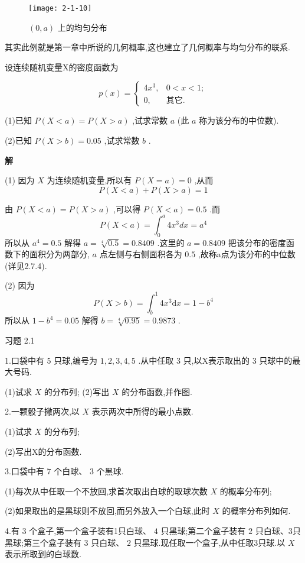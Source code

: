 \begin{figure}
	\centering
	\texttt{[image: 2-1-10]}
	\caption{ $ (0,a) $ 上的均匀分布}
	\label{fig:2-1-10}
\end{figure}

其实此例就是第一章中所说的几何概率,这也建立了几何概率与均匀分布的联系.

\begin{example}
	设连续随机变量X的密度函数为
	
	\[ 
	p(x)=\left\{\begin{array}{ll}
	{4 x^{3},} & {0<x<1}; \\ 
	{0},&{\text{其它}}.
	\end{array}\right.
	\]
	
	(1)已知 $ P(X<a)=P(X>a) $ ,试求常数 $ a $ (此 $ a $ 称为该分布的中位数).
	
	(2)已知 $ P(X>b)=0.05 $ ,试求常数 $ b $ .
	
	\textbf{解}
	
	(1) 因为 $ X $ 为连续随机变量,所以有 $ P(X=a)=0 $ ,从而
	\[ 
	P(X<a)+P(X>a)=1
	\]
	
	由 $ P(X<a)=P(X>a) $ ,可以得 $ P(X<a)=0.5 $ .而
	\[ 
	P(X<a)=\int_{0}^{a} 4 x^{3} d x=a^{4}
	\]
	所以从 $ a^4=0.5 $ 解得 $ a=\sqrt[4]{0.5}=0.8409 $ .这里的 $ a=0.8409 $ 把该分布的密度函数下的面积分为两部分, $ a $ 点左侧与右侧面积各为 $ 0.5 $ ,故称a点为该分布的中位数(详见2.7.4).
	
	(2) 因为
	\[ 
	P(X>b)=\int_{b}^{1} 4 x^{3} \mathrm{d} x=1-b^{4}
	\]
	所以从 $ 1-b^{4}=0.05 $ 解得 $ b=\sqrt[4]{0.95}=0.9873 $ .
\end{example}

习题 2.1

1.口袋中有 $ 5 $ 只球,编号为 $ 1,2,3,4,5 $ .从中任取 $ 3 $ 只,以X表示取出的 $ 3 $ 只球中的最大号码.

(1)试求 $ X $ 的分布列;
(2)写出 $ X $ 的分布函数,并作图.

2.一颗骰子撇两次,以 $ X $ 表示两次中所得的最小点数.

(1)试求 $ X $ 的分布列;

(2)写出X的分布函数.

3.口袋中有 $ 7 $ 个白球、 $ 3 $ 个黑球.

(1)每次从中任取一个不放回,求首次取出白球的取球次数 $ X $ 的概率分布列;

(2)如果取出的是黑球则不放回,而另外放入一个白球,此时 $ X $ 的概率分布列如何.

4.有 $ 3 $ 个盒子,第一个盒子装有1只白球、 $ 4 $ 只黑球;第二个盒子装有 $ 2 $ 只白球、3只黑球;第三个盒子装有 $ 3 $ 只白球、 $ 2 $ 只黑球.现任取一个盒子,从中任取3只球.以 $ X $ 表示所取到的白球数.

